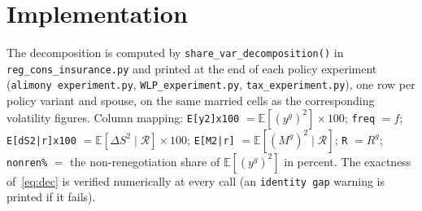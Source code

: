 \documentclass[11pt]{article}
\newcommand{\E}{\mathbb{E}}
\newcommand{\ren}{\mathcal{R}}
\begin{document}
\section{Implementation}

The decomposition is computed by \texttt{share\_var\_decomposition()} in
\texttt{reg\_cons\_insurance.py} and printed at the end of each policy
experiment (\texttt{alimony experiment.py}, \texttt{WLP\_experiment.py},
\texttt{tax\_experiment.py}), one row per policy variant and spouse, on the
same married cells as the corresponding volatility figures. Column mapping:
\texttt{E[y2]x100} $=\E[(y^g)^2]\times 100$; \texttt{freq} $=f$;
\texttt{E[dS2|r]x100} $=\E[\Delta S^2\mid\ren]\times 100$;
\texttt{E[M2|r]} $=\E[(M^g)^2\mid\ren]$; \texttt{R} $=R^g$;
\texttt{nonren\%} $=$ the non-renegotiation share of $\E[(y^g)^2]$ in
percent. The exactness of~\eqref{eq:dec} is verified numerically at every
call (an \texttt{identity gap} warning is printed if it fails).
\end{document}

